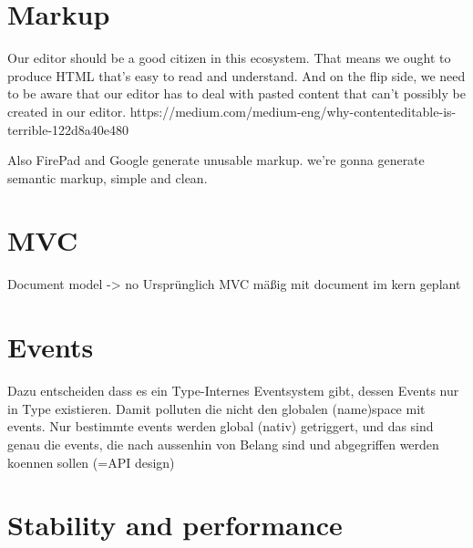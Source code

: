 \section{Markup} 

Our editor should be a good citizen in this ecosystem. That means we ought to produce HTML that’s easy to read and understand. And on the flip side, we need to be aware that our editor has to deal with pasted content that can’t possibly be created in our editor. https://medium.com/medium-eng/why-contenteditable-is-terrible-122d8a40e480

Also FirePad and Google generate unusable markup. we're gonna generate semantic markup, simple and clean.



\section{MVC}

Document model -> no
Ursprünglich MVC mäßig mit document im kern geplant 

\section{Events}

Dazu entscheiden dass es ein Type-Internes Eventsystem gibt, dessen Events nur in Type existieren. Damit polluten die nicht den globalen (name)space mit events. Nur bestimmte events werden global (nativ) getriggert, und das sind genau die events, die nach aussenhin von Belang sind und abgegriffen werden koennen sollen (=API design)

\section{Stability and performance}


